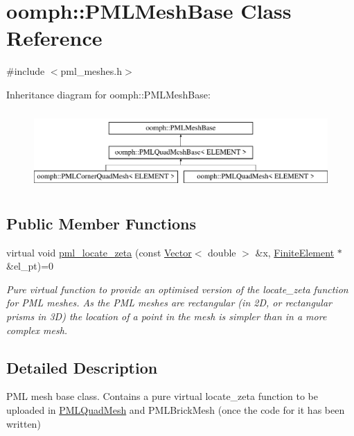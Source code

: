 \hypertarget{classoomph_1_1PMLMeshBase}{}\section{oomph\+:\+:P\+M\+L\+Mesh\+Base Class Reference}
\label{classoomph_1_1PMLMeshBase}


{\ttfamily \#include $<$pml\+\_\+meshes.\+h$>$}

Inheritance diagram for oomph\+:\+:P\+M\+L\+Mesh\+Base\+:\begin{figure}[H]
\begin{center}
\leavevmode
\includegraphics[height=3.000000cm]{classoomph_1_1PMLMeshBase}
\end{center}
\end{figure}
\subsection*{Public Member Functions}
\begin{DoxyCompactItemize}
\item 
virtual void \hyperlink{classoomph_1_1PMLMeshBase_a49d7e044f51a32bed758d4c16052b995}{pml\+\_\+locate\+\_\+zeta} (const \hyperlink{classoomph_1_1Vector}{Vector}$<$ double $>$ \&x, \hyperlink{classoomph_1_1FiniteElement}{Finite\+Element} $\ast$\&el\+\_\+pt)=0
\begin{DoxyCompactList}\small\item\em Pure virtual function to provide an optimised version of the locate\+\_\+zeta function for P\+ML meshes. As the P\+ML meshes are rectangular (in 2D, or rectangular prisms in 3D) the location of a point in the mesh is simpler than in a more complex mesh. \end{DoxyCompactList}\end{DoxyCompactItemize}


\subsection{Detailed Description}
P\+ML mesh base class. Contains a pure virtual locate\+\_\+zeta function to be uploaded in \hyperlink{classoomph_1_1PMLQuadMesh}{P\+M\+L\+Quad\+Mesh} and P\+M\+L\+Brick\+Mesh (once the code for it has been written) 

